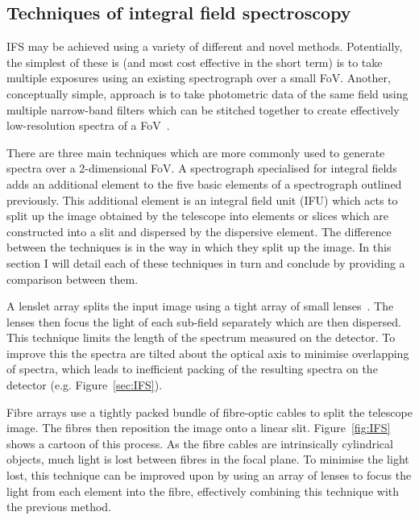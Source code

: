 \subsection{Techniques of integral field spectroscopy} %
\label{sub:techniques_of_integral_field_spectroscopy}

IFS may be achieved using a variety of different and novel methods.
Potentially, the simplest of these is (and most cost effective in the short term) is to take multiple exposures using an existing spectrograph over a small FoV.
Another, conceptually simple, approach is to take photometric data of the same field using multiple narrow-band filters which can be stitched together to create effectively low-resolution spectra of a FoV~\citep[e.g. GTC-OSIRIS][]{2011PASP..123.1107M}.


There are three main techniques which are more commonly used to generate spectra over a 2-dimensional FoV.
A spectrograph specialised for integral fields adds an additional element to the five basic elements of a spectrograph outlined previously.
This additional element is an integral field unit (IFU) which acts to split up the image obtained by the telescope into elements or slices which are constructed into a slit and dispersed by the dispersive element.
The difference between the techniques is in the way in which they split up the image.
In this section I will detail each of these techniques in turn and conclude by providing a comparison between them.

A lenslet array splits the input image using a tight array of small lenses~\citep{1995A&AS..113..347B}.
The lenses then focus the light of each sub-field separately which are then dispersed.
This technique limits the length of the spectrum measured on the detector.
To improve this the spectra are tilted about the optical axis to minimise overlapping of spectra, which leads to inefficient packing of the resulting spectra on the detector (e.g. Figure~\ref{sec:IFS}).

Fibre arrays use a tightly packed bundle of fibre-optic cables to split the telescope image.
The fibres then reposition the image onto a linear slit.
Figure~\ref{fig:IFS} shows a cartoon of this process.
As the fibre cables are intrinsically cylindrical objects, much light is lost between fibres in the focal plane.
To minimise the light lost, this technique can be improved upon by using an array of lenses to focus the light from each element into the fibre, effectively combining this technique with the previous method.

